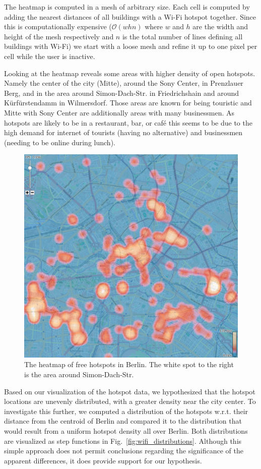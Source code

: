 The heatmap is computed in a mesh of
arbitrary size. Each cell is computed by adding
the nearest distances of all buildings with a Wi-Fi
hotspot together.
Since this is computationally expensive ($\mathcal{O}(whn)$ where $w$ and $h$
are the width and height of the mesh respectively and $n$ is the total number of lines
defining all buildings with Wi-Fi)
we start with a loose mesh and refine it up to one pixel per cell while the
user is inactive.

Looking at the heatmap reveals some areas with higher density of open hotspots.
Namely the center of the city (Mitte), around the Sony Center, in Prenzlauer Berg, and
in the area around Simon-Dach-Str. in Friedrichshain and around Kürfürstendamm in Wilmersdorf.
Those areas are known for being touristic and Mitte with Sony Center are additionally
areas with many businessmen.
As hotspots are likely to be in a restaurant, bar, or caf\'{e}
this seems to be due to the high demand for internet
of tourists (having no alternative) and businessmen (needing to
be online during lunch).

\begin{figure}
\centering
\includegraphics[width=0.9\linewidth]{imgs/heat}
\caption{The heatmap of free hotspots in Berlin.
The white spot to the right is the area around Simon-Dach-Str.}
\label{fig:heat}
\end{figure}

Based on our visualization of the hotspot data, we hypothesized that the hotspot locations are unevenly distributed, with a greater density near the city center. To investigate this further, we computed a distribution of the hotspots w.r.t. their distance from the centroid of Berlin and compared it to the distribution that would result from a uniform hotspot density all over Berlin. Both distributions are visualized as step functions in Fig.~\ref{fig:wifi_distributions}. Although this simple approach does not permit conclusions regarding the significance of the apparent differences, it does provide support for our hypothesis.

